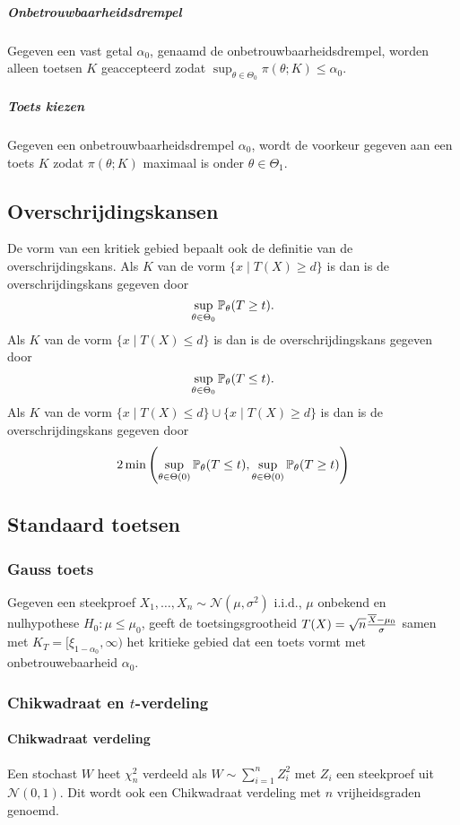 \subparagraph{Onbetrouwbaarheidsdrempel} Gegeven een vast getal \(\alpha_{0}\),
genaamd de onbetrouwbaarheidsdrempel, worden alleen toetsen \(K\) geaccepteerd
zodat \(\sup_{\theta\in\Theta_{0}}\pi(\theta;K)\leq\alpha_{0}\).

\subparagraph{Toets kiezen} Gegeven een onbetrouwbaarheidsdrempel \(\alpha_{0}\),
wordt de voorkeur gegeven aan een toets \(K\) zodat \(\pi(\theta;K)\) maximaal
is onder \(\theta\in\Theta_{1}\).

\subsection{Overschrijdingskansen}
De vorm van een kritiek gebied bepaalt ook de definitie van de
overschrijdingskans. Als \(K\) van de vorm \(\{x\mid T(X)\geq d\}\) is dan is de
overschrijdingskans gegeven door
\[
    \sup_{\theta\in\Theta_{0}}\mathbb{P}_{\theta}(T\geq t).
\]
Als \(K\) van de vorm \(\{x\mid T(X)\leq d\}\) is dan is de
overschrijdingskans gegeven door
\[
    \sup_{\theta\in\Theta_{0}}\mathbb{P}_{\theta}(T\leq t).
\]
Als \(K\) van de vorm \(\{x\mid T(X)\leq d\}\cup\{x\mid T(X)\geq d\}\) is dan is
de overschrijdingskans gegeven door
\[
    2\min\left(\sup_{\theta\in\Theta(0)}\mathbb{P}_{\theta}(T\leq t),
    \sup_{\theta\in\Theta(0)}\mathbb{P}_{\theta}(T\geq t)\right)
\]

\subsection{Standaard toetsen}
\subsubsection{Gauss toets}
Gegeven een steekproef \(X_{1},\dots,X_{n}\sim \mathcal{N}(\mu,\sigma^{2})\)
i.i.d., \(\mu\) onbekend en nulhypothese \(H_{0}:\mu\leq\mu_{0}\), geeft de
toetsingsgrootheid \(T(X)=\sqrt{n}\frac{\overline{X}-\mu_{0}}{\sigma}\) samen met
\(K_{T}=[\xi_{1-\alpha_{0}},\infty)\) het kritieke gebied dat een toets vormt
met onbetrouwebaarheid \(\alpha_{0}\).

\subsubsection{Chikwadraat en \texorpdfstring{\(t\)}{t}-verdeling}
\paragraph{Chikwadraat verdeling} Een stochast \(W\) heet \(\chi^{2}_{n}\)
verdeeld als \(W\sim\sum_{i=1}^{n}Z_{i}^{2}\) met \(Z_{i}\) een steekproef
uit \(\mathcal{N}(0,1)\). Dit wordt ook een Chikwadraat verdeling met \(n\)
vrijheidsgraden genoemd.

